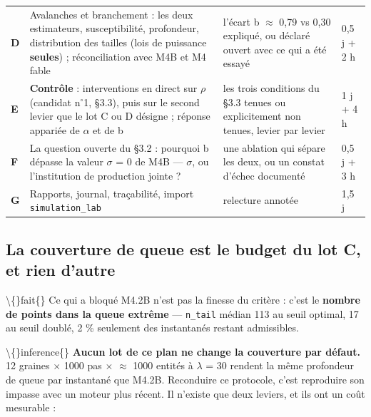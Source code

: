 \documentclass[11pt,a4paper]{article}
\newcommand{\code}[1]{\texttt{#1}}
\providecommand{\degree}{\ensuremath{^\circ}}
\begin{document}
\begin{center}
\begin{tabularx}{\linewidth}{@{}lXXX@{}}
\textbf{D} & Avalanches et branchement : les deux estimateurs, susceptibilité, profondeur, distribution des tailles (lois de puissance \textbf{seules}) ; réconciliation avec M4B et M4 fable & l'écart b \ensuremath{\approx} 0,79 vs 0,30 expliqué, ou déclaré ouvert avec ce qui a été essayé & 0,5 j + 2 h \\
\textbf{E} & \textbf{Contrôle} : interventions en direct sur \ensuremath{\rho} (candidat n\degree{}1, §3.3), puis sur le second levier que le lot C ou D désigne ; réponse appariée de \ensuremath{\alpha} et de b & les trois conditions du §3.3 tenues ou explicitement non tenues, levier par levier & 1 j + 4 h \\
\textbf{F} & La question ouverte du §3.2 : pourquoi b dépasse la valeur \ensuremath{\sigma} = 0 de M4B --- \ensuremath{\sigma}, ou l'institution de production jointe ? & une ablation qui sépare les deux, ou un constat d'échec documenté & 0,5 j + 3 h \\
\textbf{G} & Rapports, journal, traçabilité, import \code{simulation\_lab} & relecture annotée & 1,5 j \\
\bottomrule
\end{tabularx}
\end{center}

\subsection*{La couverture de queue est le budget du lot C, et rien d'autre}

\textbackslash\{\}fait\{\} Ce qui a bloqué M4.2B n'est pas la finesse du critère : c'est le \textbf{nombre de points dans la queue extrême} --- \code{n\_tail} médian 113 au seuil optimal, 17 au seuil doublé, 2 \% seulement des instantanés restant admissibles.

\textbackslash\{\}inference\{\} \textbf{Aucun lot de ce plan ne change la couverture par défaut.} 12 graines \ensuremath{\times} 1000 pas \ensuremath{\times} \ensuremath{\approx} 1000 entités à \ensuremath{\lambda} = 30 rendent la même profondeur de queue par instantané que M4.2B. Reconduire ce protocole, c'est reproduire son impasse avec un moteur plus récent. Il n'existe que deux leviers, et ils ont un coût mesurable :
\end{document}
